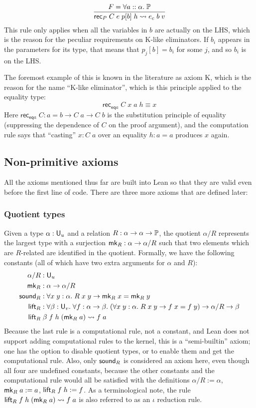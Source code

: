 $$\frac{F=\forall a::\alpha.\;\P}{\rec_P\;C\;e\;p[b]\;h\rightsquigarrow e_c\;b\;v}$$
This rule only applies when all the variables in $b$ are actually on the LHS, which is the reason for the peculiar requirements on K-like eliminators. If $b_i$ appears in the parameters for its type, that means that $p_j[b]=b_i$ for some $j$, and so $b_i$ is on the LHS. 

The foremost example of this is known in the literature as axiom K, which is the reason for the name ``K-like eliminator'', which is this principle applied to the equality type:
$$\mathsf{rec}_{\mathsf{eq}a}\;C\;x\;a\;h\equiv x$$
Here $\mathsf{rec}_{\mathsf{eq}a}\;C:a=b\to C\;a\to C\;b$ is the substitution principle of equality (suppressing the dependence of $C$ on the proof argument), and the computation rule says that ``casting'' $x:C\;a$ over an equality $h:a=a$ produces $x$ again.
%
\subsection{Non-primitive axioms}

All the axioms mentioned thus far are built into Lean so that they are valid even before the first line of code. There are three more axioms that are defined later:

\subsubsection{Quotient types}
Given a type $\alpha:\U_u$ and a relation $R:\alpha\to\alpha\to\P$, the quotient $\alpha/R$ represents the largest type with a surjection $\mk_R:\alpha\to\alpha/R$ such that two elements which are $R$-related are identified in the quotient. Formally, we have the following constants (all of which have two extra arguments for $\alpha$ and $R$):
\begin{align*}
\alpha/R&:\U_u\\
\mk_R&:\alpha\to\alpha/R\\
\sound_R&:\forall x\;y:\alpha.\;R\;x\;y\to \mk_R\;x=\mk_R\;y\\
\lift_R&:\forall\beta:\U_v.\;\forall f:\alpha\to\beta.\;(\forall x\;y:\alpha.\;R\;x\;y\to f\;x=f\;y)\to \alpha/R\to\beta\\
\lift_R&\;\beta\;f\;h\;(\mk_R\;a)\rightsquigarrow f\;a
\end{align*}
Because the last rule is a computational rule, not a constant, and Lean does not support adding computational rules to the kernel, this is a ``semi-builtin'' axiom; one has the option to disable quotient types, or to enable them and get the computational rule. Also, only $\sound_R$ is considered an axiom here, even though all four are undefined constants, because the other constants and the computational rule would all be satisfied with the definitions $\alpha/R:=\alpha$, $\mk_R\;a:=a$, $\lift_R\;f\;h:=f$. As a terminological note, the rule $\lift_R\;f\;h\;(\mk_R\;a)\rightsquigarrow f\;a$ is also referred to as an $\iota$ reduction rule.

